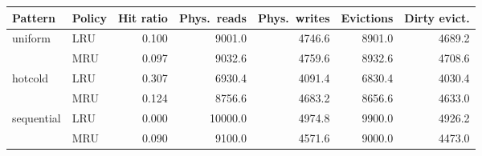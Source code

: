 \begin{tabular}{llrrrrr}
\toprule
Pattern & Policy & Hit ratio & Phys.\ reads & Phys.\ writes & Evictions & Dirty evict. \\
\midrule
uniform & LRU & 0.100 & 9001.0 & 4746.6 & 8901.0 & 4689.2 \\
 & MRU & 0.097 & 9032.6 & 4759.6 & 8932.6 & 4708.6 \\
\midrule
hotcold & LRU & 0.307 & 6930.4 & 4091.4 & 6830.4 & 4030.4 \\
 & MRU & 0.124 & 8756.6 & 4683.2 & 8656.6 & 4633.0 \\
\midrule
sequential & LRU & 0.000 & 10000.0 & 4974.8 & 9900.0 & 4926.2 \\
 & MRU & 0.090 & 9100.0 & 4571.6 & 9000.0 & 4473.0 \\
\bottomrule
\end{tabular}
